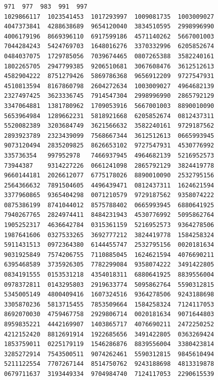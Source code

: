 \documentclass[10pt,a4paper]{article}
\begin{document}
\newpage
\setcounter{page}{429}

\newpage
\setcounter{page}{430}

\newpage
\setcounter{page}{431}

\newpage
\setcounter{page}{432}

\newpage
\setcounter{page}{433}

\begin{verbatim}
971  977  983  991  997
1029866117  1023541453  1017293997  1009081735  1003009027
4047373841  4288638689  9654120040  3834510595  2998996990
4006179196  8669396110  6917599186  4571140262  5667001003
7044284243  5424769703  1648016276  3370332996  6205852674
0484037075  1729785056  7039674465  0807265388  3582240161
1802265705  2947799385  9206510681  3067608476  3612512613
4582904222  8751279426  5869786368  9656912209  9727547931
4510813594  8167860798  2604272634  1003009027  4964682139
2327497425  3623336745  7914547304  2998996990  2865792129
3347064881  1381780962  1709053916  5667001003  8890010090
5653964984  1289662231  5818921668  6205852674  0812437311
5520082389  3203684749  3621566632  3582240161  9729187562
2893923789  2323439099  7568667344  3612512613  0665993945
9073120494  2835209825  8626653102  9727547931  4530776992
335736354   997952978   7466937945  4964682139  5216952573
73944387    9314227226  0661241098  2865792129  3824419778
9660144181  2026612077  6775178026  8890010090  2532795156
2564366632  7891504605  4496439471  0812437311  1624621594
3377960865  9365404298  0071210579  9729187562  9358074222
0875386199  8741044012  8575788402  0665993945  6880641925
7940267765  2824974411  8484231943  4530776992  5095862764
1905252317  4636642784  0315361159  5216952573  9364278506
1987641606  0327533265  3692777212  3824419778  1584258324
5911431513  0972364380  6144455747  2532795156  0020181634
9031925849  7574206755  7110885045  1624621594  4076690211
6395468589  3735926305  7782299084  9358074222  3491422805
0834191555  0153531218  4354018311  6880641925  8839556004
0978372811  0143295803  2919633774  5095862764  5590312815
5345005149  4800409416  1607324516  9364278506  9243188698
3305870236  5813715455  7853509664  1584258324  7124117053
8692070030  4759467758  2929806714  0020181634  9071644803
8959835221  4442169907  1403865717  4076690211  2472250252
4212152420  8812691914  1922685656  3491422805  0363269424
1853759011  0225179119  1546286876  8839556004  3380423814
3285272914  7543500511  9074262461  5590312815  9845610494
5211122554  7707267144  8514750762  9243188698  4813319878
0679711637  3193449334  9704984740  7124117053  2290615539

\end{verbatim}
\end{document}
